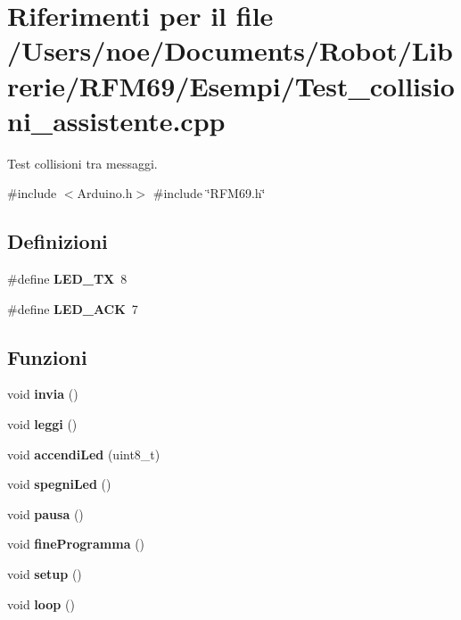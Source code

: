 \section{Riferimenti per il file /\+Users/noe/\+Documents/\+Robot/\+Librerie/\+R\+F\+M69/\+Esempi/\+Test\+\_\+collisioni\+\_\+assistente.cpp}
\label{_test__collisioni__assistente_8cpp}


Test collisioni tra messaggi.  


{\ttfamily \#include $<$Arduino.\+h$>$}\newline
{\ttfamily \#include \char`\"{}R\+F\+M69.\+h\char`\"{}}\newline
\subsection*{Definizioni}
\begin{DoxyCompactItemize}
\item 
\mbox{\label{_test__collisioni__assistente_8cpp_a66dbe921e452d7831e1f1f7ff8d720ff}} 
\#define {\bfseries L\+E\+D\+\_\+\+TX}~8
\item 
\mbox{\label{_test__collisioni__assistente_8cpp_a365035e660d1eae73ced4109ba9f8288}} 
\#define {\bfseries L\+E\+D\+\_\+\+A\+CK}~7
\end{DoxyCompactItemize}
\subsection*{Funzioni}
\begin{DoxyCompactItemize}
\item 
\mbox{\label{_test__collisioni__assistente_8cpp_a30929ad9aa20be449cfdcfdf096b011f}} 
void {\bfseries invia} ()
\item 
\mbox{\label{_test__collisioni__assistente_8cpp_a5ba7c94d7b647769c1eab4535fdf0ca4}} 
void {\bfseries leggi} ()
\item 
\mbox{\label{_test__collisioni__assistente_8cpp_a3569164e5c9c054a56d5f70566d8a57d}} 
void {\bfseries accendi\+Led} (uint8\+\_\+t)
\item 
\mbox{\label{_test__collisioni__assistente_8cpp_a06e193cb7e01cd99fcfee23c739abac9}} 
void {\bfseries spegni\+Led} ()
\item 
\mbox{\label{_test__collisioni__assistente_8cpp_ad3befffba77b3954d6bbea4d22afc517}} 
void {\bfseries pausa} ()
\item 
\mbox{\label{_test__collisioni__assistente_8cpp_ae1b6bae9fef1e0d04a56b321386b699c}} 
void {\bfseries fine\+Programma} ()
\item 
\mbox{\label{_test__collisioni__assistente_8cpp_a4fc01d736fe50cf5b977f755b675f11d}} 
void {\bfseries setup} ()
\item 
\mbox{\label{_test__collisioni__assistente_8cpp_afe461d27b9c48d5921c00d521181f12f}} 
void {\bfseries loop} ()
\end{DoxyCompactItemize}

